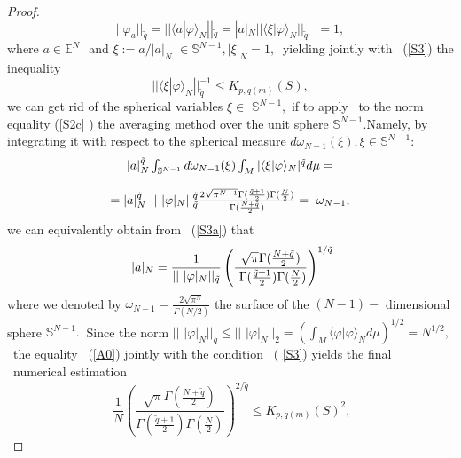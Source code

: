 \documentclass[pdflatex,sn-mathphys-num]{sn-jnl}%
\theoremstyle{thmstyleone}%
\theoremstyle{thmstyletwo}%
\theoremstyle{thmstylethree}%
\begin{document}
\begin{proof}
\begin{equation}
		||\varphi _{a}||_{\tilde{q}}=||\langle a|\varphi \rangle _{N}||_{\tilde{q}%
		}=|a|_{N}||\langle \xi |\varphi \rangle _{N}||_{\tilde{q}}\text{ }=1,
		\label{S2c}
	\end{equation}%
	where $a\in \mathbb{E}^{N}\ $\ and $\xi :=a/|a|_{N}$ $\in \mathbb{S}%
	^{N-1},|\xi |_{N}=1,\ $ yielding jointly with \ (\ref{S3}) the inequality 
	\begin{equation}
		||\langle \xi |\varphi \rangle _{N}||_{\tilde{q}}^{-1}\leq K_{p,q(m)}(S),
		\label{S2d}
	\end{equation}%
	we can get rid of the spherical variables $\xi \in $ $\mathbb{S}^{N-1},$ if
	to apply \ to the norm equality (\ref{S2c} ) the averaging method \cite{John}
	over the unit sphere $\mathbb{S}^{N-1}. $Namely, by integrating it with
	respect to the spherical measure $d\omega _{N-1}(\xi ),\xi \in \mathbb{S}%
	^{N-1}:$ 
	\begin{equation}
		\begin{array}{c}
			|a|_{N}^{\tilde{q}}\int_{\mathbb{S}^{N-1}}d\omega _{N-1}(\xi
			)\int_{M}|\langle \xi |\varphi \rangle _{N}|^{\tilde{q}}d\mu = \\ 
			\\ 
			=|a|_{N}^{\tilde{q}}\text{ }||\text{ }|\varphi |_{N}||_{\tilde{q}}^{\tilde{q}%
			}\frac{2\sqrt{\pi ^{N-1}}\Gamma (\frac{\tilde{q}+1}{2})\Gamma (\frac{N}{2})}{%
				\Gamma (\frac{N+\tilde{q}}{2})}=\ \omega _{N-1},%
		\end{array}
		\label{S3a}
	\end{equation}%
	we can equivalently obtain from \ (\ref{S3a}) that  
	\begin{equation}
		\text{ }|a|_{N}=\frac{1}{||\text{ }|\varphi |_{N}||_{\tilde{q}}}\left( \frac{%
			\sqrt{\pi }\Gamma (\frac{N+\tilde{q}}{2})}{\ \Gamma (\frac{\tilde{q}+1}{2}%
			)\Gamma (\frac{N}{2})}\right) ^{1/\tilde{q}}  \label{A0}
	\end{equation}%
	where we denoted by $\omega _{N-1}=\frac{2\sqrt{\pi ^{N}}}{\Gamma (N/2)}$
	the surface of the $(N-1)-$ dimensional sphere $\mathbb{S}^{N-1}.$ $\ $Since
	the norm $||$ $|\varphi |_{N}||_{\tilde{q}}\leq ||$ $|\varphi
	|_{N}||_{2}=\left( \int_{M}\langle \varphi |\varphi \rangle _{N}d\mu \right)
	^{1/2}=N^{1/2},$ \ the equality \ (\ref{A0}) jointly with the condition \ (%
	\ref{S3}) yields the final \ numerical estimation 
	\begin{equation}
		\ \frac{1}{N}\left( \frac{\sqrt{\pi }\Gamma (\frac{N+\tilde{q}}{2})}{\Gamma (%
			\frac{\tilde{q}+1}{2})\Gamma (\frac{N}{2})}\right) ^{2/\tilde{q}}\leq
		K_{p,q(m)}(S)^{2},  \label{A0a}
	\end{equation}
	

\end{proof}
\end{document}
